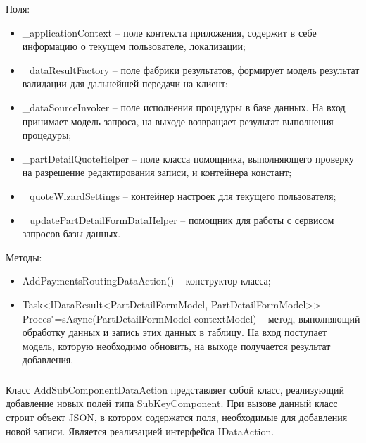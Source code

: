Поля:
\begin{itemize}
  \item \_applicationContext – поле контекста приложения, содержит в себе информацию о текущем пользователе, локализации;
  \item \_dataResultFactory – поле фабрики результатов, формирует модель результат валидации для дальнейшей передачи на клиент;
  \item \_dataSourceInvoker – поле исполнения процедуры в базе данных. На вход принимает модель запроса, на выходе возвращает результат выполнения процедуры;
  \item \_partDetailQuoteHelper – поле класса помощника, выполняющего проверку на разрешение редактирования записи, и контейнера констант;
  \item \_quoteWizardSettings – контейнер настроек для текущего пользователя;
  \item \_updatePartDetailFormDataHelper – помощник для работы с сервисом запросов базы данных.
\end{itemize}

Методы:
\begin{itemize}
  \item AddPaymentsRoutingDataAction() – конструктор класса;
  \item Task<IDataResult<PartDetailFormModel, PartDetailFormModel>> Proces"=sAsync(PartDetailFormModel contextModel) – метод, выполняющий обработку данных и запись этих данных в таблицу. На вход поступает модель, которую необходимо обновить, на выходе получается результат добавления.
\end{itemize}

\subsubsection{}
\label{sub:arch_and_mod:data_layer:add_sub_component}

Класс AddSubComponentDataAction представляет собой класс, реализующий добавление новых полей типа SubKeyComponent. При вызове данный класс строит объект JSON, в котором содержатся поля, необходимые для добавления новой записи. Является реализацией интерфейса IDataAction.

